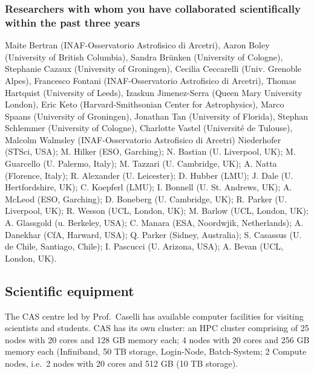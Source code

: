 \documentclass[10pt,fleqn,twoside]{article}
\begin{document}
\subsubsection{Researchers with whom you have collaborated scientifically within the past three years}

Maite Bertran (INAF-Osservatorio Astrofisico di Arcetri), Aaron Boley (University of British Columbia), Sandra Brünken (University of Cologne), Stephanie Cazaux (University of Groningen), Cecilia Ceccarelli (Univ. Grenoble Alpes), Francesco Fontani (INAF-Osservatorio Astrofisico di Arcetri), Thomas Hartquist (University of Leeds), Izaskun Jimenez-Serra (Queen Mary University London), Eric Keto (Harvard-Smithsonian Center for Astrophysics), Marco Spaans (University of Groningen), Jonathan Tan (University of Florida), Stephan Schlemmer (University of Cologne), Charlotte Vastel (Université de Tulouse), Malcolm Walmsley (INAF-Osservatorio Astrofisico di Arcetri)
 Niederhofer (STSci, USA); M. Hilker (ESO, Garching); N. Bastian (U. Liverpool,
UK); M. Guarcello (U. Palermo, Italy); M. Tazzari (U. Cambridge, UK);
A. Natta (Florence, Italy); R. Alexander (U. Leicester); D. Hubber
(LMU); J. Dale (U. Hertfordshire, UK); C. Koepferl (LMU); I. Bonnell
(U. St. Andrews, UK); A. McLeod (ESO, Garching); D. Boneberg
(U. Cambridge, UK); R. Parker (U. Liverpool, UK); R. Wesson (UCL,
London, UK); M. Barlow (UCL, London, UK); A. Glassgold (u. Berkeley,
USA); C. Manara (ESA, Noordwjik, Netherlands); A. Danekhar (CfA,
Harward, USA); Q. Parker (Sidney, Australia); S. Casassus
(U. de Chile, Santiago, Chile); I. Pascucci (U. Arizona, USA);
A. Bevan (UCL, London, UK).

\subsection{Scientific equipment}

The CAS centre led by Prof.\ Caselli has available computer facilities for visiting scientists and students. CAS has its own cluster: an HPC cluster comprising of 25 nodes with 20 cores and 128 GB memory each; 4 nodes with 20 cores and 256 GB memory each (Infiniband, 50 TB storage, Login-Node, Batch-System; 2 Compute nodes, i.e.\ 2 nodes with 20 cores and 512 GB (10 TB storage). 
\end{document}
